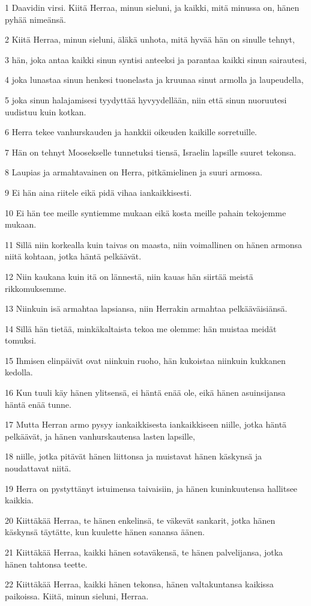 \par 1 Daavidin virsi. Kiitä Herraa, minun sieluni, ja kaikki, mitä minussa on, hänen pyhää nimeänsä.
\par 2 Kiitä Herraa, minun sieluni, äläkä unhota, mitä hyvää hän on sinulle tehnyt,
\par 3 hän, joka antaa kaikki sinun syntisi anteeksi ja parantaa kaikki sinun sairautesi,
\par 4 joka lunastaa sinun henkesi tuonelasta ja kruunaa sinut armolla ja laupeudella,
\par 5 joka sinun halajamisesi tyydyttää hyvyydellään, niin että sinun nuoruutesi uudistuu kuin kotkan.
\par 6 Herra tekee vanhurskauden ja hankkii oikeuden kaikille sorretuille.
\par 7 Hän on tehnyt Moosekselle tunnetuksi tiensä, Israelin lapsille suuret tekonsa.
\par 8 Laupias ja armahtavainen on Herra, pitkämielinen ja suuri armossa.
\par 9 Ei hän aina riitele eikä pidä vihaa iankaikkisesti.
\par 10 Ei hän tee meille syntiemme mukaan eikä kosta meille pahain tekojemme mukaan.
\par 11 Sillä niin korkealla kuin taivas on maasta, niin voimallinen on hänen armonsa niitä kohtaan, jotka häntä pelkäävät.
\par 12 Niin kaukana kuin itä on lännestä, niin kauas hän siirtää meistä rikkomuksemme.
\par 13 Niinkuin isä armahtaa lapsiansa, niin Herrakin armahtaa pelkääväisiänsä.
\par 14 Sillä hän tietää, minkäkaltaista tekoa me olemme: hän muistaa meidät tomuksi.
\par 15 Ihmisen elinpäivät ovat niinkuin ruoho, hän kukoistaa niinkuin kukkanen kedolla.
\par 16 Kun tuuli käy hänen ylitsensä, ei häntä enää ole, eikä hänen asuinsijansa häntä enää tunne.
\par 17 Mutta Herran armo pysyy iankaikkisesta iankaikkiseen niille, jotka häntä pelkäävät, ja hänen vanhurskautensa lasten lapsille,
\par 18 niille, jotka pitävät hänen liittonsa ja muistavat hänen käskynsä ja noudattavat niitä.
\par 19 Herra on pystyttänyt istuimensa taivaisiin, ja hänen kuninkuutensa hallitsee kaikkia.
\par 20 Kiittäkää Herraa, te hänen enkelinsä, te väkevät sankarit, jotka hänen käskynsä täytätte, kun kuulette hänen sanansa äänen.
\par 21 Kiittäkää Herraa, kaikki hänen sotaväkensä, te hänen palvelijansa, jotka hänen tahtonsa teette.
\par 22 Kiittäkää Herraa, kaikki hänen tekonsa, hänen valtakuntansa kaikissa paikoissa. Kiitä, minun sieluni, Herraa.

